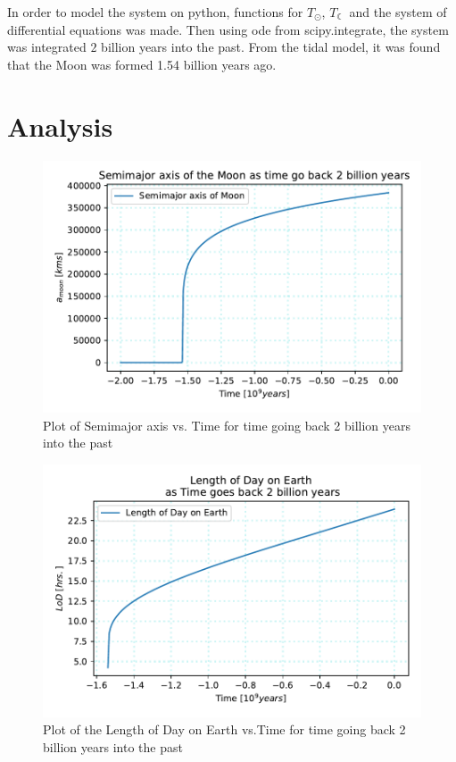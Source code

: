 \documentclass[12pt]{article}
\begin{document}
In order to model the system on python, functions for $T_{\odot}$, $T_{\leftmoon}$ and the system of differential equations was made. Then using ode from scipy.integrate, the system was integrated $2$ billion years into the past. From the tidal model, it was found that the Moon was formed 1.54 billion years ago.

\section{Analysis}
\begin{figure}[H]
\centering
\includegraphics[scale=0.80]{plot1.pdf}
\caption{Plot of Semimajor axis vs. Time for time going back 2 billion years into the past}
\end{figure}

\begin{figure}[H]
\centering
\includegraphics[scale=0.80]{plot2.pdf}
\caption{Plot of the Length of Day on Earth vs.Time for time going back 2 billion years into the past}
\end{figure}
\end{document}
